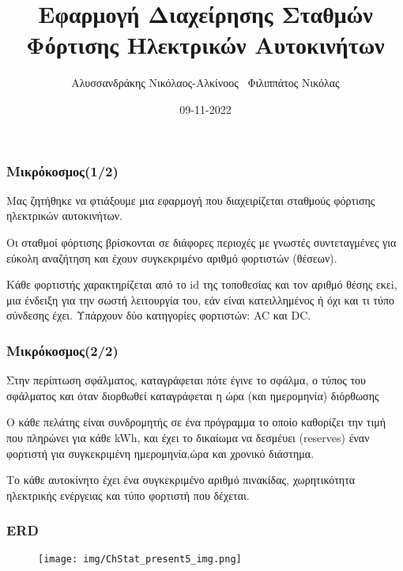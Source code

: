 \documentclass[10pt]{beamer}
\title{Εφαρμογή Διαχείρησης Σταθμών Φόρτισης Ηλεκτρικών Αυτοκινήτων}
\author{Αλυσσανδράκης Νικόλαος-Αλκίνοος \newline ~Φιλιππάτος Νικόλας}
\date{09-11-2022}
\begin{document}
\begin{frame}
    \titlepage
\end{frame}

\begin{frame}
    \frametitle{Μικρόκοσμος(1/2)}

    Μας ζητήθηκε να φτιάξουμε μια εφαρμογή που διαχειρίζεται σταθμούς φόρτισης ηλεκτρικών αυτοκινήτων.\newline

    Οι σταθμοί φόρτισης βρίσκονται σε διάφορες περιοχές με γνωστές συντεταγμένες για εύκολη αναζήτηση και έχουν συγκεκριμένο αριθμό φορτιστών (θέσεων).\newline

    Κάθε φορτιστής χαρακτηρίζεται από το id της τοποθεσίας και τον αριθμό θέσης εκεi, μια ένδειξη για την σωστή λειτουργία του, εάν είναι κατειλλημένος ή όχι και τι τύπο σύνδεσης έχει. 
    Υπάρχουν δύο κατηγορίες φορτιστών: AC και DC.\newline



\end{frame}

\begin{frame}
    \frametitle{Μικρόκοσμος(2/2)}
    
    Στην περίπτωση σφάλματος, καταγράφεται πότε έγινε το σφάλμα, ο τύπος του σφάλματος και όταν διορθωθεί καταγράφεται η ώρα (και ημερομηνία) διόρθωσης\newline

    Ο κάθε πελάτης είναι συνδρομητής σε ένα πρόγραμμα το οποίο καθορίζει την τιμή που πληρώνει για κάθε kWh, και έχει το δικαίωμα να δεσμέυει (reserves) έναν φορτιστή για συγκεκριμένη ημερομηνία,ώρα και χρονικό διάστημα.\newline

    Το κάθε αυτοκίνητο έχει ένα συγκεκριμένο αριθμό πινακίδας, χωρητικότητα ηλεκτρικής ενέργειας και τύπο φορτιστή που δέχεται.
\end{frame}

\begin{frame}
    \frametitle{ERD}

    \begin{adjustwidth*}{-3cm}{-3cm}
    \begin{figure}
        \centering
        \texttt{[image: img/ChStat\_present5\_img.png]}
    \end{figure}
    \end{adjustwidth*}

\end{frame}
\end{document}
